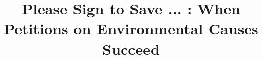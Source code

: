 \documentclass[letterpaper]{article}
\begin{document}

\title{Please Sign to Save ... : When Petitions on Environmental Causes Succeed}



\newcommand{\etal}[1]{#1~\emph{et al.}}

%
%
%
\end{document}
